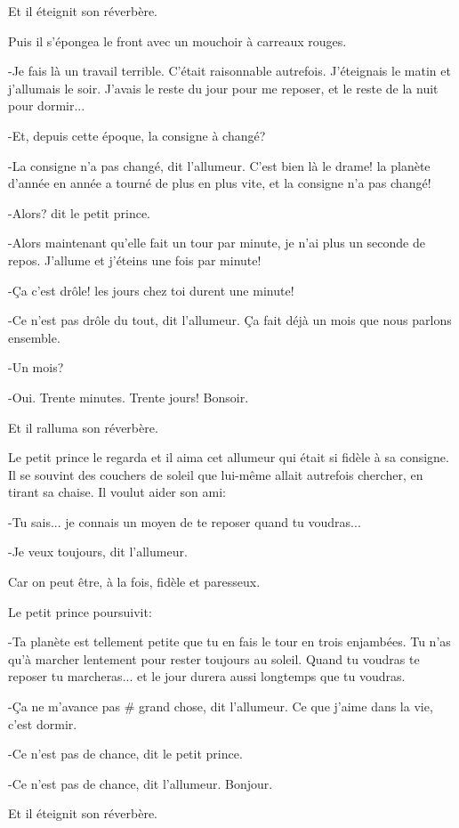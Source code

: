 \documentclass{report}
\begin{document}
Et il éteignit son réverbère.

Puis il s'épongea le front avec un mouchoir à carreaux rouges.

-Je fais là un travail terrible. C'était raisonnable autrefois. J'éteignais le matin et j'allumais le soir. J'avais le reste du jour pour me reposer, et le reste de la nuit pour dormir...

-Et, depuis cette époque, la consigne à changé?

-La consigne n'a pas changé, dit l'allumeur. C'est bien là le drame! la planète d'année en année a tourné de plus en plus vite, et la consigne n'a pas changé!

-Alors? dit le petit prince.

-Alors maintenant qu'elle fait un tour par minute, je n'ai plus un seconde de repos. J'allume et j'éteins une fois par minute!

-Ça c'est drôle! les jours chez toi durent une minute!

-Ce n'est pas drôle du tout, dit l'allumeur. Ça fait déjà un mois que nous parlons ensemble.

-Un mois?

-Oui. Trente minutes. Trente jours! Bonsoir.

Et il ralluma son réverbère.

Le petit prince le regarda et il aima cet allumeur qui était si fidèle à sa consigne. Il se souvint des couchers de soleil que lui-même allait autrefois chercher, en tirant sa chaise. Il voulut aider son ami:

-Tu sais... je connais un moyen de te reposer quand tu voudras...

-Je veux toujours, dit l'allumeur.

Car on peut être, à la fois, fidèle et paresseux.

Le petit prince poursuivit:

-Ta planète est tellement petite que tu en fais le tour en trois enjambées. Tu n'as qu'à marcher lentement pour rester toujours au soleil. Quand tu voudras te reposer tu marcheras... et le jour durera aussi longtemps que tu voudras.

-Ça ne m'avance pas \# grand chose, dit l'allumeur. Ce que j'aime dans la vie, c'est dormir.

-Ce n'est pas de chance, dit le petit prince.

-Ce n'est pas de chance, dit l'allumeur. Bonjour.

Et il éteignit son réverbère.
\end{document}
